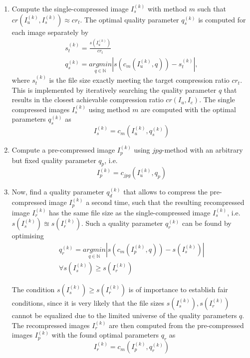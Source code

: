 \documentclass[10pt,twocolumn,letterpaper]{article}
\begin{document}
\begin{enumerate}
	\item Compute the single-compressed image $I_s^{(k)}$ with method $m$ such that $cr(I_u^{(k)}, I_s^{(k)}) \approx cr_t$. The optimal quality parameter $q_s^{(k)}$ is computed for each image separately by
	\vspace{-5mm}
	\begin{eqnarray}
	s_t^{(k)} = \frac{s(I_u^{(k)})}{cr_t} \\
	q_s^{(k)} = \underset{q \in \mathbb{N}}{argmin}|s(c_m(I_u^{(k)},q)) - s_t^{(k)}|,
	\end{eqnarray} where $s_t^{(k)}$ is the file size exactly meeting the target compression ratio $cr_t$. This is implemented by iteratively searching the quality parameter $q$ that results in the closest achievable compression ratio $cr(I_u, I_c)$. The single compressed images $I_s^{(k)}$ using method $m$ are computed with the optimal parameters $ q_s^{(k)}$ as
	\begin{equation}
	I_s^{(k)} = c_m(I_u^{(k)}, q_s^{(k)})
	\end{equation}
	
	\item Compute a pre-compressed image $I_p^{(k)}$ using $jpg$-method with an arbitrary but fixed quality parameter $q_p$, i.e. 
	\begin{equation}
		I_p^{(k)} = c_{jpg}(I_u^{(k)}, q_p)
	\end{equation}
	
	\item Now, find a quality parameter $q_d^{(k)}$ that allows to compress the pre-compressed image $I_p^{(k)}$ a second time, such that the resulting recompressed image $I_r^{(k)}$ has the same file size as the single-compressed image $I_s^{(k)}$, i.e. $s(I_s^{(k)}) \approxeq s(I_r^{(k)})$. Such a quality parameter $q_r^{(k)}$ can be found by optimising
	\begin{eqnarray}	
		q_r^{(k)} = \underset{q \in \mathbb{N}}{argmin}|s(c_m(I_p^{(k)},q)) - s(I_s^{(k)})| \\
		\forall s(I_s^{(k)}) \geq s(I_r^{(k)})
		\label{equ:recomp}
	\end{eqnarray}
	\vspace{-5mm}
	
The condition $s(I_s^{(k)}) \geq s(I_r^{(k)})$ is of importance to establish fair conditions, since it is very likely that the file sizes $s(I_s^{(k)}), s(I_r^{(k)})$  cannot be equalized due to the limited universe of the quality parameters $q$. The recompressed images $I_r^{(k)}$ are then computed from the pre-compressed images $I_p^{(k)}$ with the found optimal parameters $q_r$ as
	\vspace{-2mm}
	\begin{equation}
	I_r^{(k)} = c_m(I_p^{(k)}, q_r^{(k)})
	\end{equation}
\end{enumerate}
\end{document}
